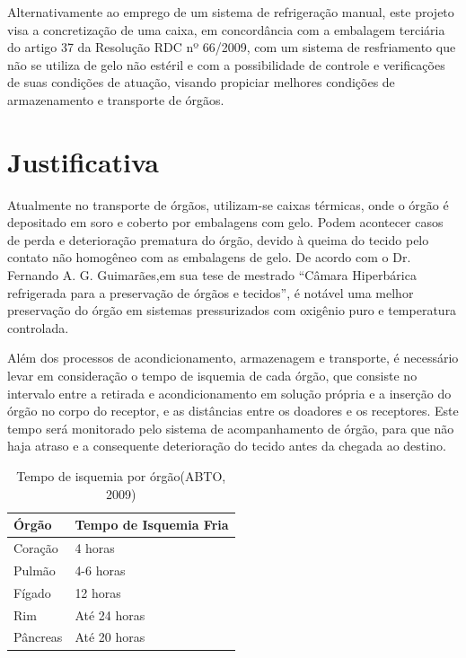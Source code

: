 Alternativamente ao emprego de um sistema de refrigeração manual, este projeto visa a concretização de uma caixa, em concordância com a embalagem terciária do artigo 37 da Resolução RDC nº 66/2009, com um sistema de resfriamento que não se utiliza de gelo não estéril e com a possibilidade de controle e verificações de suas condições de atuação, visando propiciar melhores condições de armazenamento e transporte de órgãos.


\section{Justificativa}

Atualmente no transporte de órgãos, utilizam-se caixas térmicas, onde o órgão é depositado em soro e coberto por embalagens com gelo. Podem acontecer casos de perda e deterioração prematura do órgão, devido à queima do tecido pelo contato não homogêneo com as embalagens de gelo. De acordo com o Dr. Fernando A. G. Guimarães,em sua tese de mestrado “Câmara Hiperbárica refrigerada para a preservação de órgãos e tecidos”, é notável uma melhor preservação do órgão em sistemas pressurizados com oxigênio puro e temperatura controlada.

Além dos processos de acondicionamento, armazenagem e transporte, é necessário levar em consideração o tempo de isquemia de cada órgão, que consiste no intervalo entre a retirada e acondicionamento em solução própria e a inserção do órgão no corpo do receptor,  e as distâncias entre os doadores e os receptores. Este tempo será monitorado pelo sistema de acompanhamento de órgão, para que não haja atraso e a consequente deterioração do tecido antes da chegada ao destino.


\begin{table}[h!]
\centering
\begin{tabular}{|l|l|}
\hline
\textbf{Órgão} & \textbf{Tempo de Isquemia Fria} \\ \hline
Coração        & 4 horas                         \\ \hline
Pulmão         & 4-6 horas                       \\ \hline
Fígado         & 12 horas                        \\ \hline
Rim            & Até 24 horas                    \\ \hline
Pâncreas       & Até 20 horas                    \\ \hline
\end{tabular}
\caption{Tempo de isquemia por órgão(ABTO, 2009)}\label{isquemia_orgaos}
\end{table}

